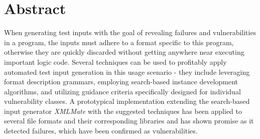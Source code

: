 \section*{Abstract}
When generating test inputs with the goal of revealing failures and vulnerabilities in a program, 
the inputs must adhere to a format specific to this program, otherwise they are 
quickly discarded without getting anywhere near executing important logic code.
Several techniques can be used to profitably apply automated test input generation in this usage scenario -
they include leveraging format description grammars, employing search-based instance development algorithms,
and utilizing guidance criteria specifically designed for individual vulnerability classes.
A prototypical implementation extending the search-based input generator \emph{XMLMate} with the suggested
techniques has been applied to several file formats and their corresponding libraries and has shown promise as
it detected failures, which have been confirmed as vulnerabilities.
